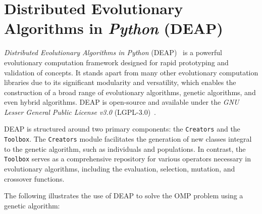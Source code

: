\section{Distributed Evolutionary Algorithms in \textit{Python} (DEAP)}
\label{sec:sota:deap}

  \emph{Distributed Evolutionary Algorithms in Python} 
  (DEAP)~\autocite{DEAPDocumentationDEAP} is a powerful evolutionary computation
  framework designed for rapid prototyping and validation of concepts.
  It stands apart from many other evolutionary computation libraries due to its
  significant modularity and versatility, which enables the construction of a
  broad range of evolutionary algorithms, genetic algorithms, and even hybrid
  algorithms.
  DEAP is open-source and available under the \textit{GNU Lesser General Public
  License v3.0} (LGPL-3.0)~\autocite{GNULesserGeneral}.

  DEAP is structured around two primary components: the \texttt{Creators} and
  the \texttt{Toolbox}.
  The \texttt{Creators} module facilitates the generation of new classes
  integral to the genetic algorithm, such as individuals and populations.
  In contrast, the \texttt{Toolbox} serves as a comprehensive repository for
  various operators necessary in evolutionary algorithms, including the
  evaluation, selection, mutation, and crossover functions.

  The following illustrates the use of DEAP to solve the OMP problem using a
  genetic algorithm:

